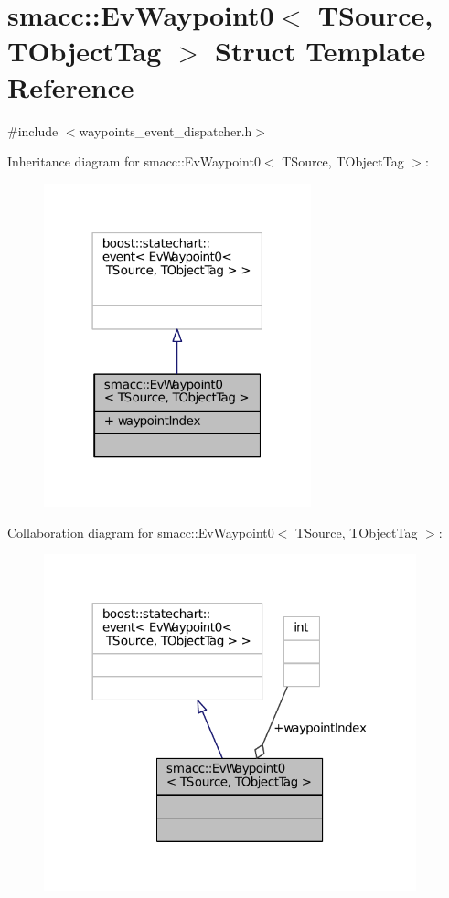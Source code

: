 \hypertarget{structsmacc_1_1EvWaypoint0}{}\section{smacc\+:\+:Ev\+Waypoint0$<$ T\+Source, T\+Object\+Tag $>$ Struct Template Reference}
\label{structsmacc_1_1EvWaypoint0}


{\ttfamily \#include $<$waypoints\+\_\+event\+\_\+dispatcher.\+h$>$}



Inheritance diagram for smacc\+:\+:Ev\+Waypoint0$<$ T\+Source, T\+Object\+Tag $>$\+:
\nopagebreak
\begin{figure}[H]
\begin{center}
\leavevmode
\includegraphics[width=219pt]{structsmacc_1_1EvWaypoint0__inherit__graph}
\end{center}
\end{figure}


Collaboration diagram for smacc\+:\+:Ev\+Waypoint0$<$ T\+Source, T\+Object\+Tag $>$\+:
\nopagebreak
\begin{figure}[H]
\begin{center}
\leavevmode
\includegraphics[width=305pt]{structsmacc_1_1EvWaypoint0__coll__graph}
\end{center}
\end{figure}
